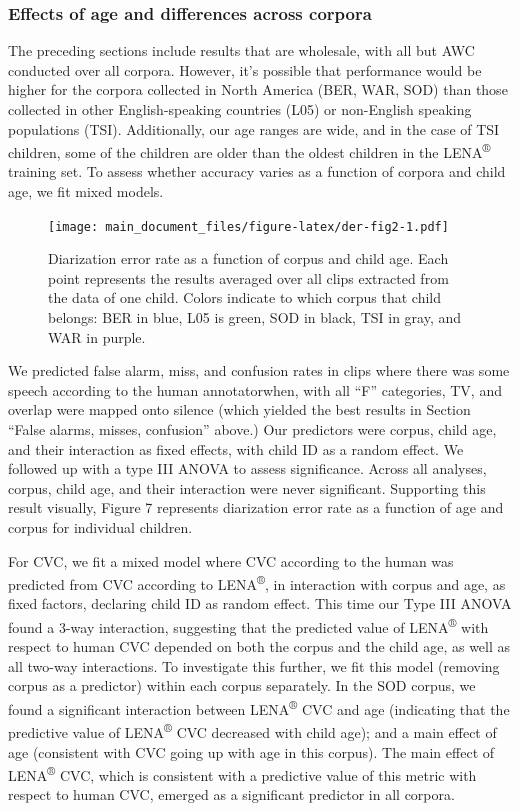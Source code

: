\documentclass[english,table,man,floatsintext]{apa6}
\begin{document}
\hypertarget{effects-of-age-and-differences-across-corpora}{%
\subsubsection{Effects of age and differences across corpora}\label{effects-of-age-and-differences-across-corpora}}

The preceding sections include results that are wholesale, with all but AWC conducted over all corpora. However, it's possible that performance would be higher for the corpora collected in North America (BER, WAR, SOD) than those collected in other English-speaking countries (L05) or non-English speaking populations (TSI). Additionally, our age ranges are wide, and in the case of TSI children, some of the children are older than the oldest children in the LENA\textsuperscript{®} training set. To assess whether accuracy varies as a function of corpora and child age, we fit mixed models.

\begin{figure}
\centering
\texttt{[image: main\_document\_files/figure-latex/der-fig2-1.pdf]}
\caption{\label{fig:der-fig2}Diarization error rate as a function of corpus and child age. Each point represents the results averaged over all clips extracted from the data of one child. Colors indicate to which corpus that child belongs: BER in blue, L05 is green, SOD in black, TSI in gray, and WAR in purple.}
\end{figure}

We predicted false alarm, miss, and confusion rates in clips where there was some speech according to the human annotatorwhen, with all \enquote{F} categories, TV, and overlap were mapped onto silence (which yielded the best results in Section \enquote{False alarms, misses, confusion} above.) Our predictors were corpus, child age, and their interaction as fixed effects, with child ID as a random effect. We followed up with a type III ANOVA to assess significance. Across all analyses, corpus, child age, and their interaction were never significant. Supporting this result visually, Figure 7 represents diarization error rate as a function of age and corpus for individual children.

For CVC, we fit a mixed model where CVC according to the human was predicted from CVC according to LENA\textsuperscript{®}, in interaction with corpus and age, as fixed factors, declaring child ID as random effect. This time our Type III ANOVA found a 3-way interaction, suggesting that the predicted value of LENA\textsuperscript{®} with respect to human CVC depended on both the corpus and the child age, as well as all two-way interactions. To investigate this further, we fit this model (removing corpus as a predictor) within each corpus separately. In the SOD corpus, we found a significant interaction between LENA\textsuperscript{®} CVC and age (indicating that the predictive value of LENA\textsuperscript{®} CVC decreased with child age); and a main effect of age (consistent with CVC going up with age in this corpus). The main effect of LENA\textsuperscript{®} CVC, which is consistent with a predictive value of this metric with respect to human CVC, emerged as a significant predictor in all corpora.
\end{document}
